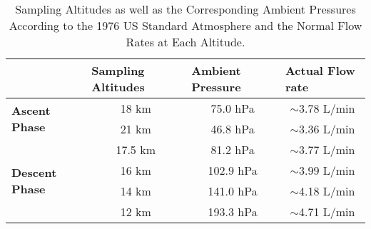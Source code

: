 
\begin{table}[H]
\centering
\begin{tabular}{|l|c|c|c|}
\hline
 & \multicolumn{1}{l|}{\textbf{Sampling Altitudes}} & \multicolumn{1}{l|}{\textbf{Ambient Pressure}} & \multicolumn{1}{l|}{\textbf{Actual Flow rate}} \\ \hline
\multirow{2}{*}{\textbf{Ascent Phase}} & 18 km & 75.0 hPa & $\sim$3.78 L/min \\ \cline{2-4} 
 & 21 km & 46.8 hPa & $\sim$3.36 L/min \\ \hline
\multirow{4}{*}{\textbf{Descent Phase}} & 17.5 km & 81.2 hPa & $\sim$3.77 L/min \\ \cline{2-4} 
 & 16 km & 102.9 hPa & $\sim$3.99 L/min \\ \cline{2-4} 
 & 14 km & 141.0 hPa & $\sim$4.18 L/min \\ \cline{2-4} 
 & 12 km & 193.3 hPa & $\sim$4.71 L/min \\ \hline
\end{tabular}
\caption{Sampling Altitudes as well as the Corresponding Ambient Pressures According to the 1976 US Standard Atmosphere and the Normal Flow Rates at Each Altitude.}
\label{tab:normal-flow-rates}
\end{table}